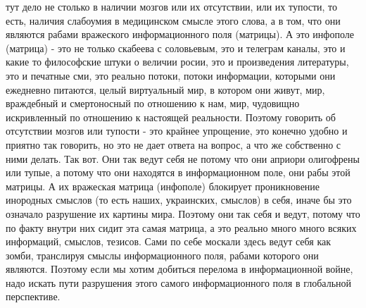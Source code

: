 тут дело не столько в наличии мозгов или их отсутствии, или их тупости, то
есть, наличия слабоумия в медицинском смысле этого слова, а в том, что они
являются рабами вражеского информационного поля (матрицы). А это инфополе
(матрица) - это не только скабеева с соловьевым, это и телеграм каналы, это и
какие то философские штуки о величии росии, это и произведения литературы, это
и печатные сми, это реально потоки, потоки информации, которыми они ежедневно
питаются, целый виртуальный мир, в котором они живут, мир, враждебный и
смертоносный по отношению к нам, мир, чудовищно искривленный по отношению к
настоящей реальности. Поэтому говорить об отсутствии мозгов или тупости - это
крайнее упрощение, это конечно удобно и приятно так говорить, но это не дает
ответа на вопрос, а что же собственно с ними делать. Так вот. Они так ведут
себя не потому что они априори олигофрены или тупые, а потому что они находятся
в информационном поле, они рабы этой матрицы. А их вражеская матрица (инфополе)
блокирует проникновение инородных смыслов (то есть наших, украинских, смыслов)
в себя, иначе бы это означало разрушение их картины мира. Поэтому они так себя
и ведут, потому что по факту внутри них сидит эта самая матрица, а это реально
много много всяких информаций, смыслов, тезисов. Сами по себе москали здесь
ведут себя как зомби, транслируя смыслы информационного поля, рабами которого
они являются. Поэтому если мы хотим добиться перелома в информационной войне,
надо искать пути разрушения этого самого информационного поля в глобальной
перспективе.
